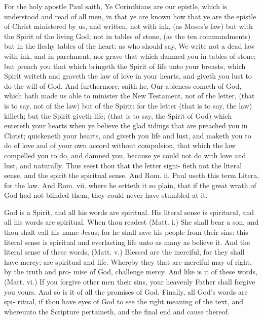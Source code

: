 \documentclass{custom}
\begin{document}
For the holy apostle Paul saith, Ye Corinthians are 
our epistle, which is understood and read of all men, in 
that ye are known how that ye are the epistle of Christ 
ministered by us, and written, not with ink, (as Moses's law) 
but with the Spirit of the living God; not in tables of 
stone, (as the ten commandments) but in the fleshy tables 
of the heart: as who should say, We write not a dead law 
with ink, and in parchment, nor grave that which damned 
you in tables of stone; but preach you that which bringeth 
the Spirit of life unto your breasts, which Spirit writeth 
and graveth the law of love in your hearts, and giveth you 
lust to do the will of God. And furthermore, saith he, 
Our ableness cometh of God, which hath made us able to 
minister the New Testament, not of the letter, (that is to 
say, not of the law) but of the Spirit: for the letter (that 
is to say, the law) killeth; but the Spirit giveth life; (that 
is to say, the Spirit of God) which entereth your hearts 
when ye believe the glad tidings that are preached you in 
Christ; quickeneth your hearts, and giveth you life and 
lust, and maketh you to do of love and of your own accord 
without compulsion, that which the law compelled you to 
do, and damned you, because ye could not do with love 
and lust, and naturally. Thus seest thou that the letter signi- 
fieth not the literal sense, and the spirit the spiritual sense. 
And Rom. ii. Paul useth this term Litera, for the law. 
And Rom. vii. where he setteth it so plain, that if the 
great wrath of God had not blinded them, they could 
never have stumbled at it. 

God is a Spirit, and all his words are spiritual. His 
literal sense is spiritural, and all his words are spiritual. 
When thou readest (Matt. i.) She shall bear a son, and 
thou shalt call his name Jesus; for he shall save his 
people from their sins: this literal sense is spiritual and 
everlasting life unto as many as believe it. And the literal 
sense of these words, (Matt. v.) Blessed are the merciful, 
for they shall have mercy; are spiritual and life. Whereby 
they that are merciful may of right, by the truth and pro- 
mise of God, challenge mercy. And like is it of these 
words, (Matt. vi.) If you forgive other men their sins, your 
heavenly Father shall forgive you yours. And so is it of 
all the promises of God. Finally, all God's words are spi- 
ritual, if thou have eyes of God to see the right meaning of 
the text, and whereunto the Scripture pertaineth, and the 
final end and cause thereof. 
\end{document}
